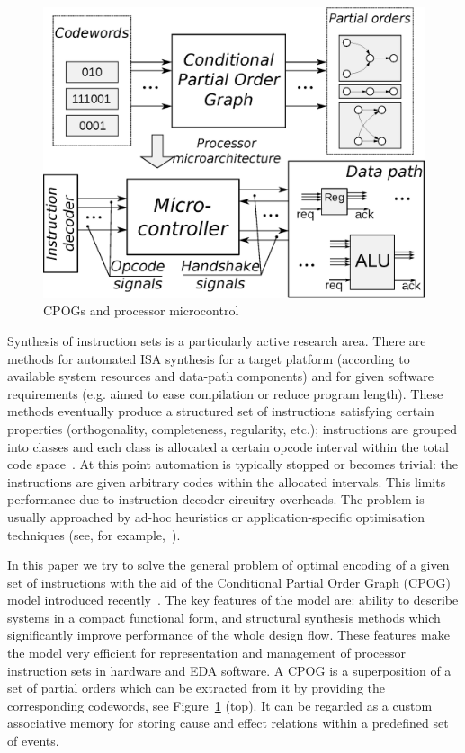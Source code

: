 \begin{figure}
\begin{centering}
\vspace{-3mm}
\includegraphics[width=0.6\columnwidth]{fig/control}\vspace{-1mm}

\par\end{centering}

\caption{CPOGs and processor microcontrol\label{fig:Dynamically-reconfigurable-controller}}
\vspace{-3mm}
\end{figure}


Synthesis of instruction sets is a particularly active research area.
There are methods for automated ISA synthesis for a target platform
(according to available system resources and data-path components)
and for given software requirements (e.g. aimed to ease compilation
or reduce program length). These methods eventually produce a structured
set of instructions satisfying certain properties (orthogonality,
completeness, regularity, etc.); instructions are grouped into classes
and each class is allocated a certain opcode interval within the total
code space~\cite{2003_nohl_dac}. At this point automation is typically
stopped or becomes trivial: the instructions are given arbitrary codes
within the allocated intervals. This limits performance due to instruction
decoder circuitry overheads. The problem is usually approached by
ad-hoc heuristics or application-specific optimisation techniques
(see, for example,~\cite{2002_lee_iccad}).

In this paper we try to solve the general problem of optimal encoding
of a given set of instructions with the aid of the Conditional Partial
Order Graph (CPOG) model introduced recently~\cite{2009_mokhov_phd}\cite{2010_mokhov_ieee}.
The key features of the model are: ability to describe systems in
a compact functional form, and structural synthesis methods which
significantly improve performance of the whole design flow. These
features make the model very efficient for representation and management
of processor instruction sets in hardware and EDA software. A CPOG
is a superposition of a set of partial orders which can be extracted
from it by providing the corresponding codewords, see Figure~\ref{fig:Dynamically-reconfigurable-controller}
(top). It can be regarded as a custom associative memory for storing
cause and effect relations within a predefined set of events.

